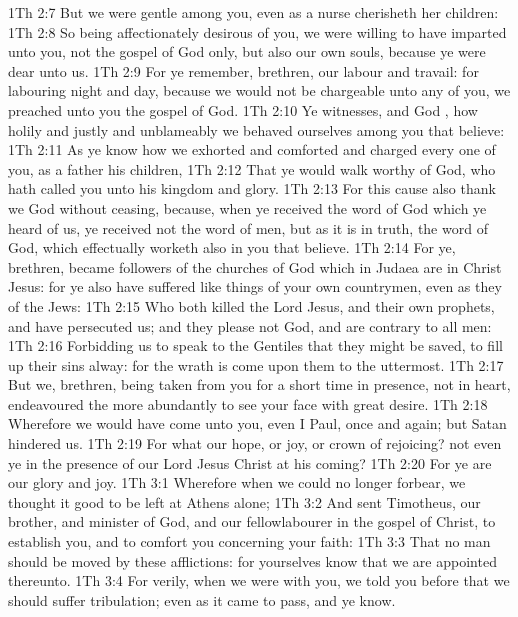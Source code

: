 \vs 1Th 2:7 But we were gentle among you, even as a nurse cherisheth her children:
\vs 1Th 2:8 So being affectionately desirous of you, we were willing to have imparted unto you, not the gospel of God only, but also our own souls, because ye were dear unto us.
\vs 1Th 2:9 For ye remember, brethren, our labour and travail: for labouring night and day, because we would not be chargeable unto any of you, we preached unto you the gospel of God.
\vs 1Th 2:10 Ye  witnesses, and God , how holily and justly and unblameably we behaved ourselves among you that believe:
\vs 1Th 2:11 As ye know how we exhorted and comforted and charged every one of you, as a father  his children,
\vs 1Th 2:12 That ye would walk worthy of God, who hath called you unto his kingdom and glory.
\vs 1Th 2:13 For this cause also thank we God without ceasing, because, when ye received the word of God which ye heard of us, ye received  not  the word of men, but as it is in truth, the word of God, which effectually worketh also in you that believe.
\vs 1Th 2:14 For ye, brethren, became followers of the churches of God which in Judaea are in Christ Jesus: for ye also have suffered like things of your own countrymen, even as they  of the Jews:
\vs 1Th 2:15 Who both killed the Lord Jesus, and their own prophets, and have persecuted us; and they please not God, and are contrary to all men:
\vs 1Th 2:16 Forbidding us to speak to the Gentiles that they might be saved, to fill up their sins alway: for the wrath is come upon them to the uttermost.
\vs 1Th 2:17 But we, brethren, being taken from you for a short time in presence, not in heart, endeavoured the more abundantly to see your face with great desire.
\vs 1Th 2:18 Wherefore we would have come unto you, even I Paul, once and again; but Satan hindered us.
\vs 1Th 2:19 For what  our hope, or joy, or crown of rejoicing?  not even ye in the presence of our Lord Jesus Christ at his coming?
\vs 1Th 2:20 For ye are our glory and joy.
\vs 1Th 3:1 Wherefore when we could no longer forbear, we thought it good to be left at Athens alone;
\vs 1Th 3:2 And sent Timotheus, our brother, and minister of God, and our fellowlabourer in the gospel of Christ, to establish you, and to comfort you concerning your faith:
\vs 1Th 3:3 That no man should be moved by these afflictions: for yourselves know that we are appointed thereunto.
\vs 1Th 3:4 For verily, when we were with you, we told you before that we should suffer tribulation; even as it came to pass, and ye know.
